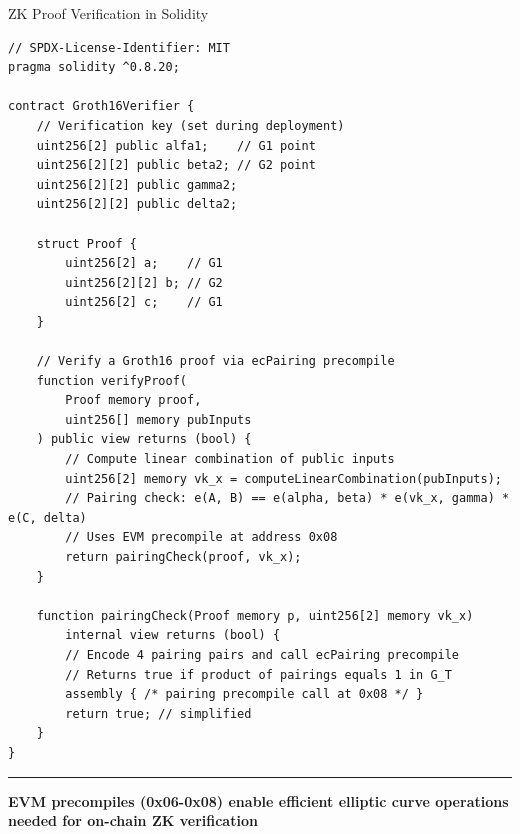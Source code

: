 \documentclass[8pt,aspectratio=169]{beamer}
\newcommand{\bottomnote}[1]{\vfill\vspace{-2mm}\textcolor{mllavender2}{\rule{\textwidth}{0.4pt}}\vspace{1mm}\footnotesize\textbf{#1}}
\begin{document}
\begin{frame}[fragile]{ZK Proof Verification in Solidity}
\begin{lstlisting}
// SPDX-License-Identifier: MIT
pragma solidity ^0.8.20;

contract Groth16Verifier {
    // Verification key (set during deployment)
    uint256[2] public alfa1;    // G1 point
    uint256[2][2] public beta2; // G2 point
    uint256[2][2] public gamma2;
    uint256[2][2] public delta2;

    struct Proof {
        uint256[2] a;    // G1
        uint256[2][2] b; // G2
        uint256[2] c;    // G1
    }

    // Verify a Groth16 proof via ecPairing precompile
    function verifyProof(
        Proof memory proof,
        uint256[] memory pubInputs
    ) public view returns (bool) {
        // Compute linear combination of public inputs
        uint256[2] memory vk_x = computeLinearCombination(pubInputs);
        // Pairing check: e(A, B) == e(alpha, beta) * e(vk_x, gamma) * e(C, delta)
        // Uses EVM precompile at address 0x08
        return pairingCheck(proof, vk_x);
    }

    function pairingCheck(Proof memory p, uint256[2] memory vk_x)
        internal view returns (bool) {
        // Encode 4 pairing pairs and call ecPairing precompile
        // Returns true if product of pairings equals 1 in G_T
        assembly { /* pairing precompile call at 0x08 */ }
        return true; // simplified
    }
}
\end{lstlisting}
\bottomnote{EVM precompiles (0x06-0x08) enable efficient elliptic curve operations needed for on-chain ZK verification}
\end{frame}
\end{document}
